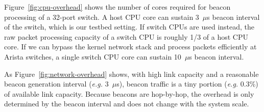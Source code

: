 Figure~\ref{fig:cpu-overhead} shows the number of cores required for beacon processing of a 32-port switch.
A host CPU core can sustain 3~$\mu$s beacon interval of the switch, which is our testbed setting.
If switch CPUs are used instead, the raw packet processing capacity of a switch CPU is roughly 1/3 of a host CPU core.
If we can bypass the kernel network stack and process packets efficiently at Arista switches, a single switch CPU core can sustain 10~$\mu$s beacon interval.


As Figure~\ref{fig:network-overhead} shows, with high link capacity and a reasonable beacon generation interval (\emph{e.g.} 3~$\mu$s), beacon traffic is a tiny portion (\emph{e.g.} 0.3\%) of available link capacity. Because beacons are hop-by-hop, the overhead is only determined by the beacon interval and does not change with the system scale.

